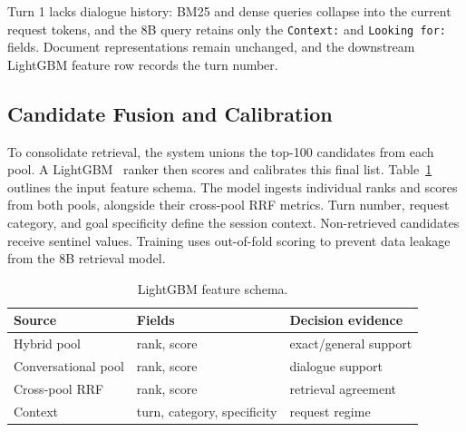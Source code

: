 \documentclass[sigconf]{acmart}
\begin{document}
Turn 1 lacks dialogue history: BM25 and dense queries collapse into the current request tokens, and the 8B query retains only the \texttt{Context:} and \texttt{Looking for:} fields. Document representations remain unchanged, and the downstream LightGBM feature row records the turn number.


\subsection{Candidate Fusion and Calibration}

To consolidate retrieval, the system unions the top-100 candidates from each pool. A LightGBM~\cite{ke2017lightgbm} ranker then scores and calibrates this final list. Table~\ref{tab:features} outlines the input feature schema. The model ingests individual ranks and scores from both pools, alongside their cross-pool RRF metrics. Turn number, request category, and goal specificity define the session context. Non-retrieved candidates receive sentinel values. Training uses out-of-fold scoring to prevent data leakage from the 8B retrieval model.

\begin{table}[h]
  \caption{LightGBM feature schema.}
  \label{tab:features}
  \centering
  \scriptsize
  \renewcommand{\arraystretch}{0.9}
  \setlength{\tabcolsep}{5pt}
  \begin{tabular}{@{}lll@{}}
    \toprule
    Source & Fields & Decision evidence \\
    \midrule
    Hybrid pool & rank, score & exact/general support \\
    Conversational pool & rank, score & dialogue support \\
    Cross-pool RRF & rank, score & retrieval agreement \\
    Context & turn, category, specificity & request regime \\
    \bottomrule
  \end{tabular}
\end{table}
\end{document}
